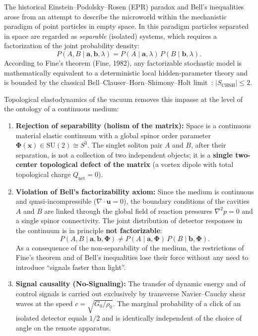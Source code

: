 \documentclass[11pt,a4paper]{article}
\theoremstyle{definition}
\theoremstyle{remark}
\begin{document}
The historical Einstein--Podolsky--Rosen (EPR) paradox and Bell's inequalities arose from an attempt to describe the microworld within the mechanistic paradigm of point particles in empty space. In this paradigm particles separated in space are regarded as \textit{separable} (isolated) systems, which requires a factorization of the joint probability density:
\begin{equation}
    P(A, B \mid \mathbf{a}, \mathbf{b}, \lambda) = P(A \mid \mathbf{a}, \lambda) \, P(B \mid \mathbf{b}, \lambda).
    \label{eq:bell_factorization_axiom}
\end{equation}
According to Fine's theorem (Fine, 1982), any factorizable stochastic model is mathematically equivalent to a deterministic local hidden-parameter theory and is bounded by the classical Bell--Clauser--Horn--Shimony--Holt limit~\cite{Bell1964,CHSH1969}: $|S_{\mathrm{CHSH}}| \le 2$.

Topological elastodynamics of the vacuum removes this impasse at the level of the ontology of a continuous medium:
\begin{enumerate}
\item \textbf{Rejection of separability (holism of the matrix):} Space is a continuous material elastic continuum with a global spinor order parameter $\boldsymbol{\Phi}(\mathbf{x}) \in \mathrm{SU}(2) \cong S^3$. The singlet soliton pair $A$ and $B$, after their separation, is not a collection of two independent objects; it is a \textbf{single two-center topological defect of the matrix} (a vortex dipole with total topological charge $Q_{\mathrm{net}} = 0$).
\item \textbf{Violation of Bell's factorizability axiom:} Since the medium is continuous and quasi-incompressible ($\nabla \cdot \mathbf{u} = 0$), the boundary conditions of the cavities $A$ and $B$ are linked through the global field of reaction pressures $\nabla^2 p = 0$ and a single spinor connectivity. The joint distribution of detector responses in the continuum is in principle \textbf{not factorizable}:
\begin{equation}
P(A, B \mid \mathbf{a}, \mathbf{b}, \boldsymbol{\Phi}) \ne P(A \mid \mathbf{a}, \boldsymbol{\Phi}) \, P(B \mid \mathbf{b}, \boldsymbol{\Phi}).
\label{eq:tev_non_factorizability}
\end{equation}
As a consequence of the non-separability of the medium, the restrictions of Fine's theorem and of Bell's inequalities lose their force without any need to introduce ``signals faster than light''.
\item \textbf{Signal causality (No-Signaling):} The transfer of dynamic energy and of control signals is carried out exclusively by transverse Navier--Cauchy shear waves at the speed $c = \sqrt{G_0/\rho_0}$. The marginal probability of a click of an isolated detector equals $1/2$ and is identically independent of the choice of angle on the remote apparatus.
\end{enumerate}
\end{document}
